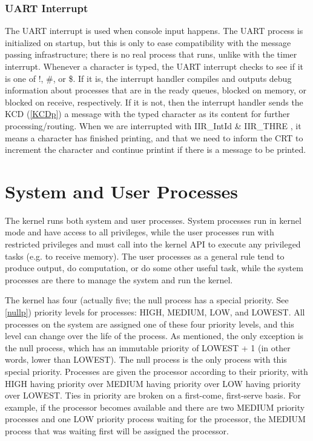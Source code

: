 \documentclass[12pt]{article}
\begin{document}
\subsubsection{UART Interrupt}\label{uarti}
The UART interrupt is used when console input happens. The UART process is initialized on startup, but this is only to ease compatibility with the message passing infrastructure; there is no real process that runs, unlike with the timer interrupt. Whenever a character is typed, the UART interrupt checks to see if it is one of !, \#, or \$. If it is, the interrupt handler compiles and outputs debug information about processes that are in the ready queues, blocked on memory, or blocked on receive, respectively. If it is not, then the interrupt handler sends the KCD (\ref{KCDp}) a message with the typed character as its content for further processing\slash routing. When we are interrupted with IIR\_IntId \& IIR\_THRE , it means a character has finished printing, and that we need to inform the CRT to increment the character and continue printint if there is a message to be printed.


\newpage
\section{System and User Processes}\label{processes}
The kernel runs both system and user processes. System processes run in kernel mode and have access to all privileges, while the user processes run with restricted privileges and must call into the kernel API to execute any privileged tasks (e.g. to receive memory). The user processes as a general rule tend to produce output, do computation, or do some other useful task, while the system processes are there to manage the system and run the kernel.

The kernel has four (actually five; the null process has a special priority. See \ref{nullp}) priority levels for processes: HIGH, MEDIUM, LOW, and LOWEST. All processes on the system are assigned one of these four priority levels, and this level can change over the life of the process. As mentioned, the only exception is the null process, which has an immutable priority of LOWEST + 1 (in other words, lower than LOWEST). The null process is the only process with this special priority. Processes are given the processor according to their priority, with HIGH having priority over MEDIUM having priority over LOW having priority over LOWEST. Ties in priority are broken on a first-come, first-serve basis. For example, if the processor becomes available and there are two MEDIUM priority processes and one LOW priority process waiting for the processor, the MEDIUM process that was waiting first will be assigned the processor.
\end{document}
